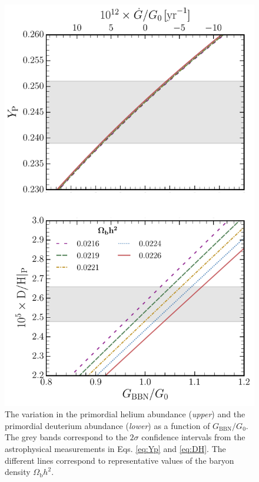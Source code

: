 \documentclass[notitlepage,twocolumn,letterpaper,natbib,aps,prl,amsmath,amsfonts,nofootinbib,preprintnumbers,superscriptaddress,secnumarabic,groupedaddress]{revtex4-1}
\begin{document}
\begin{figure}[t]
    \centering
    \includegraphics[width=\linewidth]{Yp_DH.pdf}\vspace{-0.3cm}
    \caption{The variation in the primordial helium abundance (\emph{upper}) and the primordial deuterium abundance (\emph{lower}) as a function of $G_{\mathrm{BBN}}/G_0$. The grey bands correspond to the $2\sigma$ confidence intervals from the astrophysical measurements in Eqs. \eqref{eq:Yp} and \eqref{eq:DH}. The different lines correspond to representative values of the baryon density $\Omega_{\mathrm{b}}h^2$.}
    \label{fig:abundances}
\end{figure}
\end{document}
